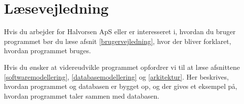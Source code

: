 \section{Læsevejledning}

Hvis du arbejder for Halvorsen ApS eller er interesseret i, hvordan du bruger programmet bør du læse afsnit \ref{brugervejledning}, hvor der bliver forklaret, hvordan programmet bruges.

Hvis du ønsker at videreudvikle programmet opfordrer vi til at læse afsnittene \ref{softwaremodellering}, \ref{databasemodellering} og \ref{arkitektur}. Her beskrives, hvordan programmet og databasen er bygget op, og der gives et eksempel på, hvordan programmet taler sammen med databasen.